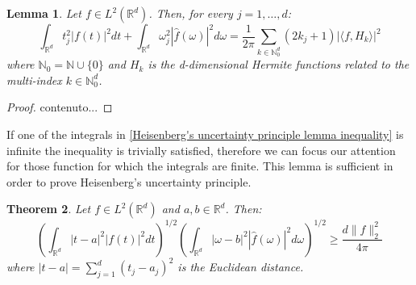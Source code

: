 \documentclass[corpo=11pt, stile=classica, tipotesi=custom,
greek, evenboxes, english]{toptesi}
\numberwithin{equation}{chapter}
\newtheorem{teo}{Theorem}[chapter] %
\newtheorem{lem}[teo]{Lemma}
\theoremstyle{remark}
\newcommand{\R}{\mathbb{R}} %
\newcommand{\N}{\mathbb{N}} %
\begin{document}
\begin{lem}\label{Heisenberg's uncertainty principle lemma d dimensions}
	Let $f \in L^2(\R^d)$. Then, for every $j = 1,\ldots,d$:
	\begin{equation}\label{Heisenberg's uncertainty principle lemma d dimensions formula}
		\int_{\R^d} t_j^2 |f(t)|^2 dt + \int_{\R^d} \omega_j^2 |\hat{f}(\omega)|^2d\omega = \dfrac{1}{2\pi} \sum_{k \in \N_0^d} (2k_j + 1) |\langle f, H_k \rangle|^2
	\end{equation}
	where $\N_0 = \N \cup \{0\}$ and $H_k$ is the d-dimensional Hermite functions related to the multi-index $k \in \N_0^d$.
\end{lem}
\begin{proof}
	contenuto...
\end{proof}
{\color{red}If one of the integrals in \eqref{Heisenberg's uncertainty principle lemma inequality} is infinite the inequality is trivially satisfied, therefore we can focus our attention for those function for which the integrals are finite}. This lemma is sufficient in order to prove Heisenberg's uncertainty principle.
\begin{teo}\label{Heisenberg's uncertainty principle theorem}
	Let $f \in L^2(\R^d)$ and $a,b \in \R^d$. Then:
	\begin{equation}\label{Heisenberg's uncertainty principle formula}
		\left( \int_{\R^d} |t-a|^2 |f(t)|^2dt \right)^{1/2} \left( \int_{\R^d} |\omega - b|^2 |\hat{f}(\omega)|^2 d\omega \right)^{1/2} \geq \dfrac{d\|f\|_2^2}{4\pi}
	\end{equation}
	where $|t-a| = \sum_{j=1}^{d}(t_j - a_j)^2$ is the Euclidean distance.
\end{teo}
\end{document}
